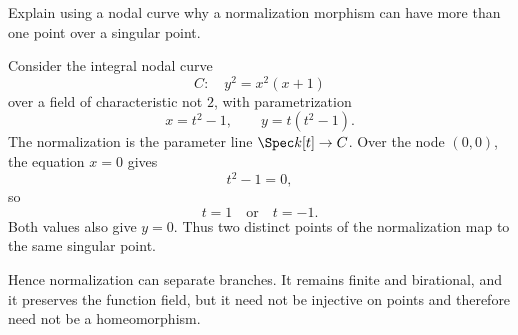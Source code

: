 \begin{problem}\label{prob:vi28-15}
Explain using a nodal curve why a normalization morphism can have more than one point over a singular point.

\end{problem}

\ifdefined\FullProblemDossiers
\begin{solution}
Consider the integral nodal curve
\[
C:\quad y^2=x^2(x+1)
\]
over a field of characteristic not \(2\), with parametrization
\[
x=t^2-1,\qquad y=t(t^2-1).
\]
The normalization is the parameter line \(\Spec k[t]\to C\). Over the node \((0,0)\), the equation \(x=0\) gives
\[
t^2-1=0,
\]
so
\[
t=1\quad\text{or}\quad t=-1.
\]
Both values also give \(y=0\). Thus two distinct points of the normalization map to the same singular point.

Hence normalization can separate branches. It remains finite and birational, and it preserves the function field, but it need not be injective on points and therefore need not be a homeomorphism.
\end{solution}
\fi
